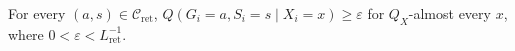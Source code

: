 For every \((a,s)\in\mathcal C_{\mathrm{ret}}\), \(Q(G_i=a,S_i=s\mid X_i=x)\ge\varepsilon\) for \(Q_X\)-almost every \(x\), where \(0<\varepsilon<L_{\mathrm{ret}}^{-1}\).